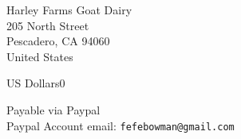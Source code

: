 \documentclass{letter}
\date{\today}
\begin{document}
  \begin{letter}{Harley Farms Goat Dairy \\
      205 North Street\\
      Pescadero, CA 94060\\
                 United States}
      \opening{}
      \begin{invoice}{US Dollars}{0}
      \end{invoice}
      \footnotesize
      Payable via Paypal \\
      Paypal Account email: \texttt{fefebowman@gmail.com}
  \end{letter}
\end{document}
